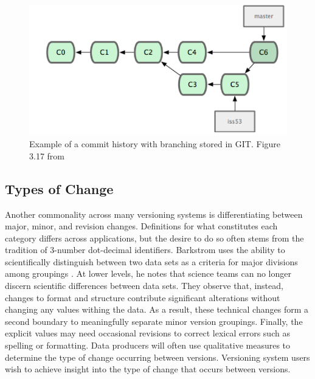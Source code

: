 \begin{figure}
	\centering
	\includegraphics[scale=0.75]{figures/GITCommitTree.png}
	\caption[Example of a commit history with branching stored in GIT.]{Example of a commit history with branching stored in GIT.  Figure 3.17 from \cite{Chacon:2009:PG:1618548}}
	\label{GITTree}
\end{figure}

\subsection{Types of Change}

Another commonality across many versioning systems is differentiating between major, minor, and revision changes.
Definitions for what constitutes each category differs across applications, but the desire to do so often stems from the tradition of 3-number dot-decimal identifiers.
Barkstrom uses the ability to scientifically distinguish between two data sets as a criteria for major divisions among groupings \cite{Barkstrom2003}.
At lower levels, he notes that science teams can no longer discern scientific differences between data sets.
They observe that, instead, changes to format and structure contribute significant alterations without changing any values withing the data.
As a result, these technical changes form a second boundary to meaningfully separate minor version groupings.
Finally, the explicit values may need occasional revisions to correct lexical errors such as spelling or formatting.
Data producers will often use qualitative measures to determine the type of change occurring between versions.
Versioning system users wish to achieve insight into the type of change that occurs between versions.

